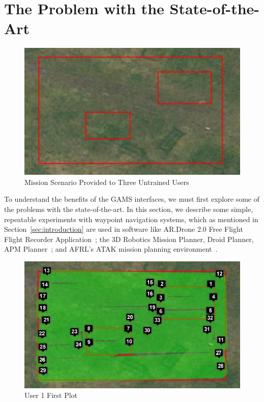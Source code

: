 \documentclass{sig-alternate-ipsn13}
\begin{document}
\section{The Problem with the State-of-the-Art}
\label{sec:waypoints}

\begin{figure}[htb]
  \centering
  \includegraphics[scale=0.4]{guiding_scenario}
  \caption{Mission Scenario Provided to Three Untrained Users}
  \label{fig:guiding}
\end{figure}

To understand the benefits of the GAMS interfaces, we must first explore some
of the problems with the state-of-the-art. In this section, we describe some
simple, repeatable experiments with waypoint navigation systems, which as
mentioned in Section~\ref{sec:introduction} are
used in software like AR.Drone 2.0 Free Flight
Flight Recorder Application~\cite{irizarry2012usability};
the 3D Robotics Mission Planner, Droid Planner,
APM Planner~\cite{arora2013development}; and AFRL's ATAK mission planning
environment~\cite{gillen2012beyond}.


\begin{figure}[h]
  \centering
  \includegraphics[scale=0.4]{user_waypoints_1}
  \caption{User 1 First Plot}
  \label{fig:user1_1}
\end{figure}
\end{document}
